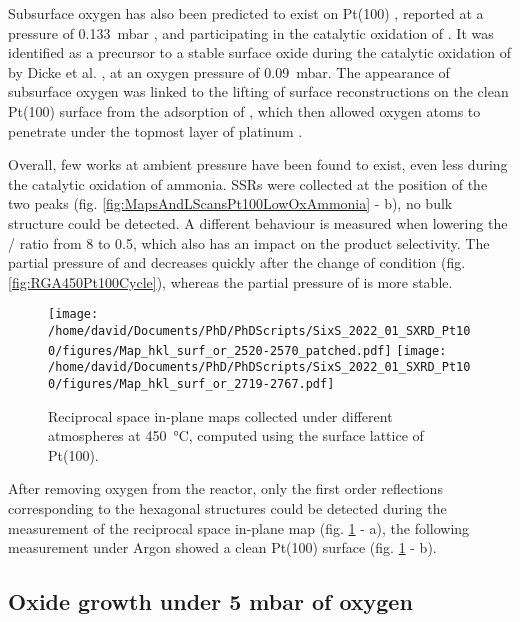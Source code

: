 Subsurface oxygen has also been predicted to exist on Pt(100) \parencite{Gu2007}, reported at a pressure of \qty{0.133}{\milli\bar} \parencite{McMillan2005}, and participating in the catalytic oxidation of .
It was identified as a precursor to a stable surface oxide during the catalytic oxidation of  by Dicke et al. \parencite*{Dicke2000}, at an oxygen pressure of \qty{0.09}{\milli\bar}.
The appearance of subsurface oxygen was linked to the lifting of surface reconstructions on the clean Pt(100) surface from the adsorption of , which then allowed oxygen atoms to penetrate under the topmost layer of platinum \parencite{Rotermund1993, Lauterbach1994}.

Overall, few works at ambient pressure have been found to exist, even less during the catalytic oxidation of ammonia.
SSRs were collected at the position of the two peaks (fig. \ref{fig:MapsAndLScansPt100LowOxAmmonia} - b), no bulk structure could be detected.
A different behaviour is measured when lowering the / ratio from \num{8} to \num{0.5}, which also has an impact on the product selectivity.
The partial pressure of  and  decreases quickly after the change of condition (fig. \ref{fig:RGA450Pt100Cycle}), whereas the partial pressure of  is more stable.

\begin{figure}[!htb]
    \centering
    \texttt{[image: /home/david/Documents/PhD/PhDScripts/SixS\_2022\_01\_SXRD\_Pt100/figures/Map\_hkl\_surf\_or\_2520-2570\_patched.pdf]}
    \texttt{[image: /home/david/Documents/PhD/PhDScripts/SixS\_2022\_01\_SXRD\_Pt100/figures/Map\_hkl\_surf\_or\_2719-2767.pdf]}
    \caption{
        Reciprocal space in-plane maps collected under different atmospheres at \qty{450}{\degreeCelsius}, computed using the surface lattice of Pt(100).
    }
    \label{fig:MapsPt100C}
\end{figure}

After removing oxygen from the reactor, only the first order reflections corresponding to the hexagonal structures could be detected during the measurement of the reciprocal space in-plane map (fig. \ref{fig:MapsPt100C} - a), the following measurement under Argon showed a clean Pt(100) surface (fig. \ref{fig:MapsPt100C} - b).

\subsection{Oxide growth under 5 mbar of oxygen}

